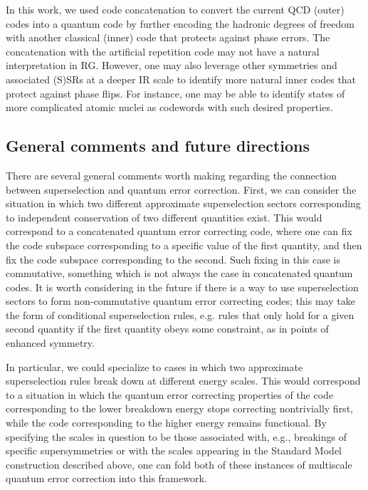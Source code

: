 \documentclass[11pt,english]{article}
\begin{document}
In this work, we used code concatenation to convert the current QCD (outer) codes into a quantum code by further encoding the hadronic degrees of freedom with another classical (inner) code that protects against phase errors. The concatenation with the artificial repetition code may not have a natural interpretation in RG. However, one may also leverage other symmetries and associated (S)SRs at a deeper IR scale to identify more natural inner codes that protect against phase flips. For instance, one may be able to identify states of more complicated atomic nuclei as codewords with such desired properties. 

\subsection{General comments and future directions}
There are several general comments worth making regarding the connection between superselection and quantum error correction. First, we can consider the situation in which two different approximate superselection sectors corresponding to independent conservation of two different quantities exist. This would correspond to a concatenated quantum error correcting code, where one can fix the code subspace corresponding to a specific value of the first quantity, and then fix the code subspace corresponding to the second. Such fixing in this case is commutative, something which is not always the case in concatenated quantum codes. It is worth considering in the future if there is a way to use superselection sectors to form non-commutative quantum error correcting codes; this may take the form of conditional superselection rules, e.g. rules that only hold for a given second quantity if the first quantity obeys some constraint, as in points of enhanced symmetry.


In particular, we could specialize to cases in which two approximate superselection rules break down at different energy scales.
This would correspond to a situation in which the quantum error correcting properties of the code corresponding to the lower breakdown energy stops correcting nontrivially first, while the code corresponding to the higher energy remains functional. By specifying the scales in question to be those associated with, e.g., breakings of specific supersymmetries or with the scales appearing in the Standard Model construction described above, one can fold both of these instances of multiscale quantum error correction into this framework.
\end{document}
